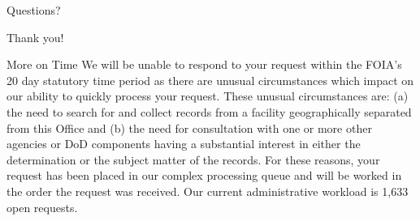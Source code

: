 \documentclass{beamer}
\begin{document}
{ %
    \begin{frame}[plain]
     \end{frame}
}

\begin{frame}
\begin{center}
Questions?
\vspace{1in}


\Huge{Thank you!}
\end{center}
\end{frame}

\begin{frame}[label=Moretime]{More on Time}
 We will be unable to respond to your request within the FOIA's 20 day statutory time period as there are unusual circumstances which impact on our ability to quickly process your request.  These unusual circumstances are:  (a) the need to search for and collect records from a facility geographically separated from this Office and (b) the need for consultation with one or more other agencies or DoD components having a substantial interest in either the determination or the subject matter of the records.  For these reasons, your request has been placed in our complex processing queue and will be worked in the order the request was received.  Our current administrative workload is 1,633 open requests. \hyperlink{back}{}
\end{frame}
 
\end{document}
